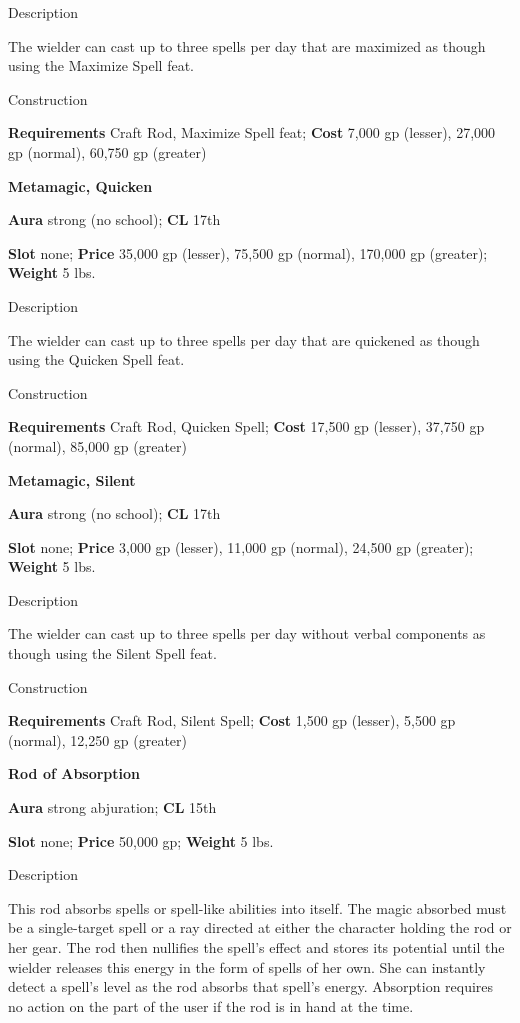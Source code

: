 Description
				
The wielder can cast up to three spells per day that 
are maximized
 as though using the Maximize Spell feat. 
				
Construction
				
\textbf{Requirements} Craft Rod, Maximize Spell feat; \textbf{Cost }7,000 gp (lesser), 27,000 gp (normal), 60,750 gp (greater)
				
\textbf{Metamagic, Quicken}
				
\textbf{Aura} strong (no school);\textbf{ CL }17th
				
\textbf{Slot} none; \textbf{Price} 35,000 gp (lesser), 75,500 gp (normal), 170,000 gp (greater); \textbf{Weight} 5 lbs.
				
Description
				
The wielder can cast up to three spells per day that 
are quickened
 as though using the Quicken Spell feat. 
				
Construction
				
\textbf{Requirements} Craft Rod, Quicken Spell; \textbf{Cost }17,500 gp (lesser), 37,750 gp (normal), 85,000 gp (greater)
				
\textbf{Metamagic, Silent}
				
\textbf{Aura} strong (no school);\textbf{ CL }17th
				
\textbf{Slot} none; \textbf{Price} 3,000 gp (lesser), 11,000 gp (normal), 24,500 gp (greater); \textbf{Weight} 5 lbs.
				
Description
				
The wielder can cast up to three spells per day without verbal components as though using the Silent Spell feat. 
				
Construction
				
\textbf{Requirements} Craft Rod, Silent Spell; \textbf{Cost }1,500 gp (lesser), 5,500 gp (normal), 12,250 gp (greater)
				
\textbf{Rod of Absorption}
				
\textbf{Aura} strong abjuration;\textbf{ CL }15th
				
\textbf{Slot} none; \textbf{Price} 50,000 gp; \textbf{Weight} 5 lbs.
				
Description
				
This rod absorbs spells or spell-like abilities into itself. The magic absorbed must be a single-target spell or a ray directed at either the character holding the rod or her gear. The rod then nullifies the spell's effect and stores its potential until the wielder releases this energy in the form of spells of her own. She can instantly detect a spell's level as the rod absorbs that spell's energy. Absorption requires no action on the part of the user if the rod is in hand at the time.
				

